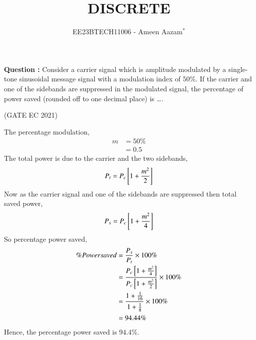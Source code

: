 \documentclass[journal,12pt,twocolumn]{IEEEtran}
\theoremstyle{remark}
\begin{document}

\vspace{3cm}

\title{DISCRETE}
\author{EE23BTECH11006 - Ameen Aazam$^{*}$%
}
\maketitle
\newpage
\bigskip

\renewcommand{\thefigure}{\theenumi}
\renewcommand{\thetable}{\theenumi}

\vspace{3cm}
\textbf{Question :}
Consider a carrier signal which is amplitude modulated by a single-tone sinusoidal message signal with a modulation index of $50\%$. If the carrier and one of the sidebands are suppressed in the modulated signal, the percentage of power saved (rounded off to one decimal place) is \ldots.

\hfill(GATE EC 2021)

\solution

The percentage modulation,
\begin{align}
    m&=50\% \\
    &=0.5
\end{align}
The total power is due to the carrier and the two sidebands,
\begin{align}
    P_t=P_c{}\left[1+\frac{m^2}{2}\right]
\end{align}
Now as the carrier signal and one of the sidebands are suppressed then total saved power,
\begin{align}
    P_s=P_c{}\left[1+\frac{m^2}{4}\right]
\end{align}
So percentage power saved,
\begin{align}
    \% Power saved&=\frac{P_s}{P_t}\times100\% \\
    &=\frac{P_c{}\left[1+\frac{m^2}{4}\right]}{P_c{}\left[1+\frac{m^2}{2}\right]}\times100\% \\
    &=\frac{1+\frac{1}{16}}{1+\frac{1}{8}}\times100\% \\
    &=94.44\%
\end{align}
Hence, the percentage power saved is $94.4\%$.
\end{document}
